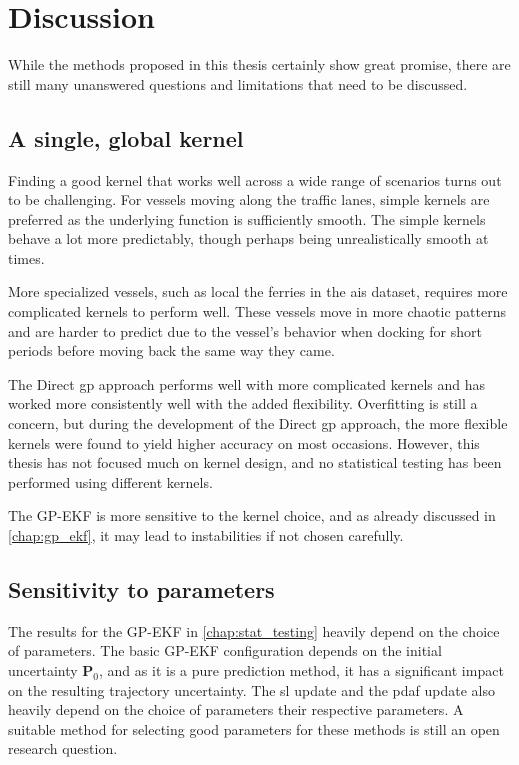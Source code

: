 \chapter{Discussion}\label{chap:discussion}

While the methods proposed in this thesis certainly show great promise, there are still many unanswered questions and limitations that need to be discussed. 


\section{A single, global kernel}
Finding a good kernel that works well across a wide range of scenarios turns out to be challenging. For vessels moving along the traffic lanes, simple kernels are preferred as the underlying function is sufficiently smooth. The simple kernels behave a lot more predictably, though perhaps being unrealistically smooth at times. 

More specialized vessels, such as local the ferries in the \acrshort{ais} dataset, requires more complicated kernels to perform well. These vessels move in more chaotic patterns and are harder to predict due to the vessel's behavior when docking for short periods before moving back the same way they came. 

The Direct \acrshort{gp} approach performs well with more complicated kernels and has worked more consistently well with the added flexibility. Overfitting is still a concern, but during the development of the Direct \acrshort{gp} approach, the more flexible kernels were found to yield higher accuracy on most occasions. However,  this thesis has not focused much on kernel design, and no statistical testing has been performed using different kernels. 

The GP-EKF is more sensitive to the kernel choice, and as already discussed in \cref{chap:gp_ekf}, it may lead to instabilities if not chosen carefully. 

\section{Sensitivity to parameters}
The results for the GP-EKF in \cref{chap:stat_testing} heavily depend on the choice of parameters. The basic GP-EKF configuration depends on the initial uncertainty $\boldsymbol{P}_0$, and as it is a pure prediction method, it has a significant impact on the resulting trajectory uncertainty. The \acrshort{sl} update and the \acrshort{pdaf} update also heavily depend on the choice of parameters their respective parameters. A suitable method for selecting good parameters for these methods is still an open research question. 

